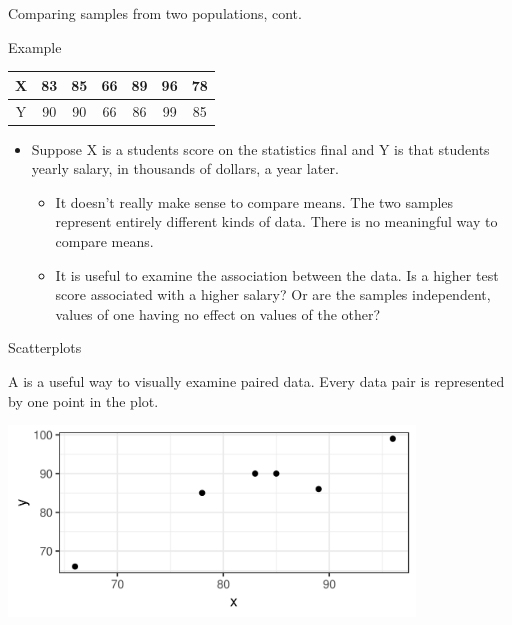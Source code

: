 \documentclass[xcolor=table, aspectratio=169, bigger]{beamer}
\begin{document}
\begin{frame}{Comparing samples from two populations, cont.}
\begin{exampleblock}{Example}
\smallskip
{\centering
\begin{tabular}{c | c c c c c c}
X & 83 & 85 & 66 & 89 & 96 & 78\\
\hline
Y & 90 & 90 & 66 & 86 & 99 & 85
\end{tabular}
\par}
\medskip
\begin{itemize}
\item Suppose X is a students score on the statistics final and Y is that students yearly salary, in thousands of dollars, a year later.
\begin{itemize}
\pause\item It doesn't really make sense to compare means. The two samples represent entirely different kinds of data. There is no meaningful way to compare means.
\pause\item It is useful to examine the association between the data. Is a higher test score associated with a higher salary? Or are the samples independent, values of one having no effect on values of the other?
\end{itemize}
\end{itemize}

\end{exampleblock}
\end{frame}

\begin{frame}{Scatterplots}
\begin{block}{}
A  is a useful way to visually examine paired data. Every data pair is represented by one point in the plot.
\end{block}
\bigskip

{\centering
\includegraphics[width=4.25in]{../images/wk11_xy_scatter}
\par}

\end{frame}
\end{document}
